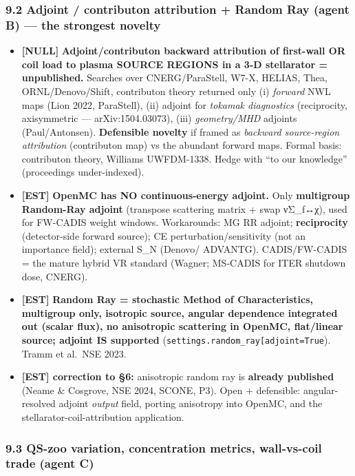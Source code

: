 \documentclass[
]{article}
\providecommand{\tightlist}{%
  \setlength{\itemsep}{0pt}\setlength{\parskip}{0pt}}
\begin{document}
\subsubsection{9.2 Adjoint / contributon attribution + Random Ray (agent
B) --- the strongest
novelty}\label{adjoint-contributon-attribution-random-ray-agent-b-the-strongest-novelty}

\begin{itemize}
\tightlist
\item
  \textbf{{[}NULL{]}} \textbf{Adjoint/contributon backward attribution
  of first-wall OR coil load to plasma SOURCE REGIONS in a 3-D
  stellarator = unpublished.} Searches over CNERG/ParaStell, W7-X,
  HELIAS, Thea, ORNL/Denovo/Shift, contributon theory returned only (i)
  \emph{forward} NWL maps (Lion 2022, ParaStell), (ii) adjoint for
  \emph{tokamak diagnostics} (reciprocity, axisymmetric ---
  arXiv:1504.03073), (iii) \emph{geometry/MHD} adjoints (Paul/Antonsen).
  \textbf{Defensible novelty} if framed as \emph{backward source-region
  attribution} (contributon map) vs the abundant forward maps. Formal
  basis: contributon theory, Williams UWFDM-1338. Hedge with ``to our
  knowledge'' (proceedings under-indexed).
\item
  \textbf{{[}EST{]}} \textbf{OpenMC has NO continuous-energy adjoint.}
  Only \textbf{multigroup Random-Ray adjoint} (transpose scattering
  matrix + swap νΣ\_f↔χ), used for FW-CADIS weight windows. Workarounds:
  MG RR adjoint; \textbf{reciprocity} (detector-side forward source); CE
  perturbation/sensitivity (not an importance field); external S\_N
  (Denovo/ ADVANTG). CADIS/FW-CADIS = the mature hybrid VR standard
  (Wagner; MS-CADIS for ITER shutdown dose, CNERG).
\item
  \textbf{{[}EST{]}} \textbf{Random Ray = stochastic Method of
  Characteristics, multigroup only, isotropic source, angular dependence
  integrated out (scalar flux), no anisotropic scattering in OpenMC,
  flat/linear source; adjoint IS supported}
  (\texttt{settings.random\_ray{[}\textquotesingle{}adjoint\textquotesingle{}{]}=True}).
  Tramm et al.~NSE 2023.
\item
  \textbf{{[}EST{]} correction to §6:} anisotropic random ray is
  \textbf{already published} (Neame \& Cosgrove, NSE 2024, SCONE, P3).
  Open + defensible: angular-resolved adjoint \emph{output} field,
  porting anisotropy into OpenMC, and the stellarator-coil-attribution
  application.
\end{itemize}

\subsubsection{9.3 QS-zoo variation, concentration metrics, wall-vs-coil
trade (agent
C)}\label{qs-zoo-variation-concentration-metrics-wall-vs-coil-trade-agent-c}
\end{document}
